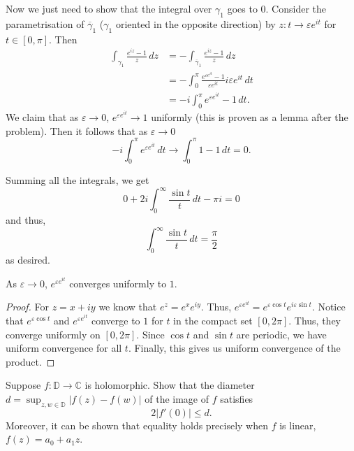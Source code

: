 \documentclass[12 pt, letterpaper]{hmcpset}
\begin{document}
\begin{solution}
	Now we just need to show that the integral over $\gamma_{1}$ goes to $0$. Consider the parametrisation of $\overline{\gamma}_{1}$ ($\gamma_{1}$ oriented in the opposite direction) by $z : t \to \varepsilon e^{it}$ for $t \in [0, \pi]$. Then
	 \[
		\begin{split}
			\int_{\gamma_{1}} \frac{e^{i z} - 1}{z} \, dz & = - \int_{\overline{\gamma}_{1}} \frac{e^{iz} - 1}{z} \, dz \\
			& = - \int_{0}^{\pi} \frac{e^{\varepsilon e^{it}} - 1}{\varepsilon e^{it}} i \varepsilon e^{it} \, dt \\
			& = - i \int_{0}^{\pi} e^{\varepsilon e^{it}} - 1 \, dt.
		\end{split} 
	\]
	We claim that as $\varepsilon \to 0$, $e^{\varepsilon e^{i t}} \to 1$ uniformly (this is proven as a lemma after the problem). Then it follows that as $\varepsilon \to 0$
	\[
		-i \int_{0}^{\pi} e^{\varepsilon e^{it}} \, dt \to \int_{0}^{\pi} 1 - 1 \, dt = 0.
	\]

	Summing all the integrals, we get
	\[
		0 + 2i \int_{0}^{\infty} \frac{\sin{t}}{t} \, dt - \pi i = 0
	\]
	and thus,
	\[
		\int_{0}^{\infty} \frac{\sin{t}}{t} \, dt = \frac{\pi}{2}
	\]
	as desired.
\end{solution}

\begin{lemma}
	As $\varepsilon \to 0$, $e^{\varepsilon e^{it}}$ converges uniformly to $1$.
\end{lemma}

\begin{proof} 
	For $z = x + iy$ we know that $e^{z} = e^{x} e^{iy}$. Thus, $e^{\varepsilon e^{it}} = e^{\varepsilon \cos{t}} e^{i \varepsilon \sin{t}}$. Notice that $e^{\varepsilon \cos{t}}$ and $e^{\varepsilon e^{it}}$ converge to $1$ for $t$ in the compact set  $[0, 2 \pi]$. Thus, they converge uniformly on $[0, 2 \pi]$. Since  $\cos{t}$ and $\sin{t}$ are periodic, we have uniform convergence for all $t$. Finally, this gives us uniform convergence of the product.
\end{proof}

\pagebreak

\begin{problem}[7.]
	Suppose $f : \mathbb{D} \to \mathbb{C}$ is holomorphic. Show that the diameter $d = \sup_{z, w \in \mathbb{D}} \lvert f(z) - f(w) \rvert$ of the image of $f$ satisfies
	\[
		2 \lvert f'(0) \rvert \le d.
	\]
	Moreover, it can be shown that equality holds precisely when $f$ is linear, $f(z) = a_{0} + a_{1} z$.
\end{problem}
\end{document}
